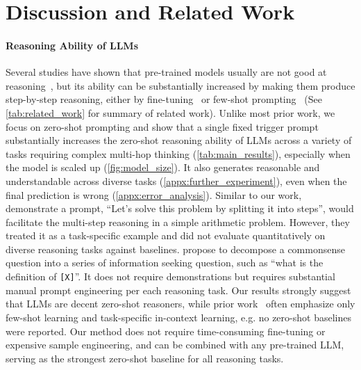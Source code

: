 \section{Discussion and Related Work}



\paragraph{Reasoning Ability of LLMs} 
Several studies have shown that pre-trained models usually are not good at reasoning~\citep{brown2020language,megatron,gopher}, but its ability can be substantially increased by making them produce step-by-step reasoning, either by fine-tuning~\citep{yourself,gsm8k,star,scratchpad} or few-shot prompting~\citep{cot_wei,cot_wei_sc,palm} (See \autoref{tab:related_work} for summary of related work).
Unlike most prior work, we focus on zero-shot prompting and
show that a single fixed trigger prompt substantially increases the zero-shot reasoning ability of LLMs across a variety of tasks requiring complex multi-hop thinking (\autoref{tab:main_results}), especially when the model is scaled up (\autoref{fig:model_size}). 
It also generates reasonable and understandable \CoT across diverse tasks (\autoref{appx:further_experiment}), even when the final prediction is wrong (\autoref{appx:error_analysis}). 
Similar to our work, \citet{prompt1} demonstrate a prompt, ``Let's solve this problem by splitting it into steps'', would facilitate the multi-step reasoning in a simple arithmetic problem. However, they treated it as a task-specific example and did not evaluate quantitatively on diverse reasoning tasks against baselines. 
\citet{selftalk} propose to decompose a commonsense question into a series of information seeking question, such as ``what is the definition of \texttt{[X]}''. It does not require demonstrations but requires substantial manual prompt engineering per each reasoning task. 
Our results strongly suggest that LLMs are decent zero-shot reasoners, while prior work~\citep{cot_wei} often emphasize only few-shot learning and task-specific in-context learning, e.g. no zero-shot baselines were reported. 
Our method does not require time-consuming fine-tuning or expensive sample engineering, and can be combined with any pre-trained LLM, serving as the strongest zero-shot baseline for all reasoning tasks. 

